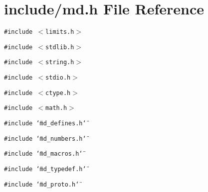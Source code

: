 \section{include/md.h File Reference}
\label{md_8h}
{\tt \#include $<$limits.h$>$}\par
{\tt \#include $<$stdlib.h$>$}\par
{\tt \#include $<$string.h$>$}\par
{\tt \#include $<$stdio.h$>$}\par
{\tt \#include $<$ctype.h$>$}\par
{\tt \#include $<$math.h$>$}\par
{\tt \#include \char`\"{}md\_\-defines.h\char`\"{}}\par
{\tt \#include \char`\"{}md\_\-numbers.h\char`\"{}}\par
{\tt \#include \char`\"{}md\_\-macros.h\char`\"{}}\par
{\tt \#include \char`\"{}md\_\-typedef.h\char`\"{}}\par
{\tt \#include \char`\"{}md\_\-proto.h\char`\"{}}\par
